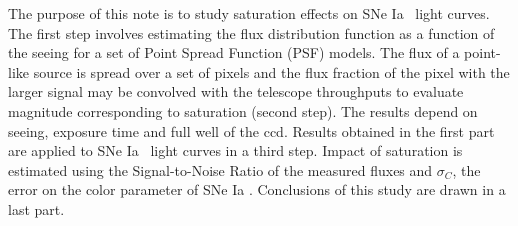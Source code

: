 \documentclass[\docopts]{\docclass}
\newcommand{\sne}{{SNe Ia }}
\newcommand{\colorerr}{{$\sigma_C$}}
\begin{document}
The purpose of this note is to study saturation effects on \sne~light curves. The first step involves estimating the flux distribution function as a function of the seeing for a set of Point Spread Function (PSF) models. The flux of a point-like source is spread over a set of pixels and the flux fraction of the pixel with the larger signal may be convolved with the telescope throughputs to evaluate magnitude corresponding to saturation (second step). The results depend on seeing, exposure time and full well of the ccd. Results obtained in the first part are applied to \sne~light curves in a third step. Impact of saturation is estimated using the Signal-to-Noise Ratio of the measured fluxes and \colorerr, the error on the color parameter of \sne. Conclusions of this study are drawn in a last part. 

\end{document}
